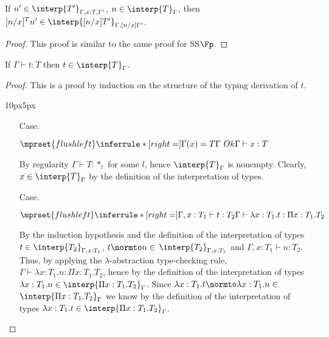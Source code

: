 \begin{lemma}
  If $n' \in \interp{T'}_{\Gamma,x:T,\Gamma'}$, $n \in \interp{T}_\Gamma$,
  then $[n/x]^T n' \in \interp{[n/x]T'}_{\Gamma,[n/x]\Gamma'}$.
  \label{lemma:interpretation_of_types_closed_substitution_ssfe}
\end{lemma}
\begin{proof}
  This proof is similar to the same proof for SS$\Fp$.
\end{proof}
\begin{thm}
  If $\Gamma \vdash t:T$ then $t \in \interp{T}_\Gamma$.
  \label{thm:soundness_ssfe}
\end{thm}
\begin{proof}
  This is a proof by induction on the structure of the typing derivation of $t$.
  \vspace{-25px}
\begin{changemargin}{10px}{5px}\noindent
\begin{itemize}
\item[Case.]\ \\
  \begin{center}
    \begin{math}
      $$\mprset{flushleft}
      \inferrule* [right=] {
        \Gamma(x) = T 
        \\
        \Gamma\ Ok
      }{\Gamma \vdash x:T}
    \end{math}
  \end{center}
  By regularity $\Gamma \vdash T:*_l$ for some $l$, hence $\interp{T}_\Gamma$ is 
  nonempty.  Clearly, $x \in \interp{T}_\Gamma$ by the definition of the interpretation
  of types.
  
\item[Case.]\ \\
  \begin{center}
    \begin{math}
      $$\mprset{flushleft}
      \inferrule* [right=] {
        \Gamma,x:T_1 \vdash t:T_2
      }{\Gamma \vdash \lambda x:T_1.t : \Pi x:T_1.T_2}
    \end{math}
  \end{center}
  By the induction hypothesis and the definition of the interpretation of types 
  $t \in \interp{T_2}_{\Gamma,x:T_1}$, $t \normto n \in $
  $ \interp{T_2}_{\Gamma,x:T_1}$ and $\Gamma,x:T_1 \vdash n:T_2$.  Thus, by
  applying the $\lambda$-abstraction type-checking rule, 
  $\Gamma \vdash \lambda x:T_1.n:\Pi x:T_1.T_2$, hence by the definition of the 
  interpretation of types 
  $\lambda x:T_1.n \in \interp{\Pi x:T_1.T_2}_\Gamma$.  Since  
  $\lambda x:T_1.t \normto \lambda x:T_1.n \in $
  $\interp{\Pi x:T_1.T_2}_\Gamma$ we know by the definition of the interpretation of types
  $\lambda x:T_1.t \in \interp{\Pi x:T_1.T_2}_\Gamma$.


\end{itemize}
\end{changemargin}
\end{proof}
